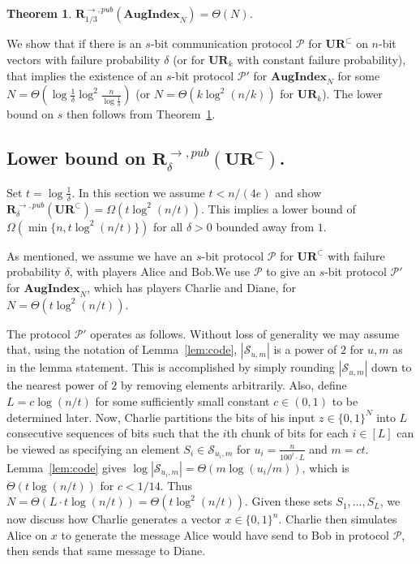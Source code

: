 \documentclass[11pt]{article}
\newtheorem{theorem}{Theorem}
\newcommand{\aug}{\mathbf{AugIndex}\xspace}
\newcommand{\ur}{\mathbf{UR}\xspace}
\newcommand{\randcom}{\mathbf{R}}
\begin{document}
\begin{theorem}{\cite{MiltersenNSW98}}\label{thm:mnsw}
$\randcom^{\rightarrow,pub}_{1/3}(\aug_N) = \Theta(N)$.
\end{theorem}

We show that if there is an $s$-bit communication protocol $\mathcal P$ for $\ur^\subset$ on $n$-bit vectors with failure probability $\delta$ (or for $\ur_k$ with constant failure probability), that implies the existence of an $s$-bit protocol $\mathcal P'$ for $\aug_N$ for some $N=\Theta(\log\frac 1{\delta}\log^2\frac n{\log\frac 1{\delta}})$ (or $N=\Theta(k\log^2(n/k))$ for $\ur_k$). The lower bound on $s$ then follows from Theorem~\ref{thm:mnsw}.


\subsection{Lower bound on $\randcom^{\rightarrow,pub}_\delta(\ur^\subset)$.}\label{sec:aug-delta}

Set $t = \log \frac 1{\delta}$. In this section we assume $t < n/(4e)$ and show $\randcom^{\rightarrow,pub}_\delta(\ur^\subset) = \Omega(t\log^2(n/t))$. This implies a lower bound of $\Omega(\min\{n, t\log^2(n/t)\})$ for all $\delta>0$ bounded away from $1$.

As mentioned, we assume we have an $s$-bit protocol $\mathcal P$ for $\ur^\subset$ with failure probability $\delta$, with players Alice and Bob.We use $\mathcal P$ to give an $s$-bit protocol $\mathcal P'$ for $\aug_N$, which has players Charlie and Diane, for $N = \Theta(t\log^2(n/t))$.

The protocol $\mathcal P'$ operates as follows. Without loss of generality we may assume that, using the notation of Lemma~\ref{lem:code}, $|\mathcal S_{u,m}|$ is a power of $2$ for $u, m$ as in the lemma statement. This is accomplished by simply rounding $|\mathcal S_{u,m}|$ down to the nearest power of $2$ by removing elements arbitrarily. Also, define $L = c\log(n/t)$ for some sufficiently small constant $c\in(0,1)$ to be determined later. Now, Charlie partitions the bits of his input $z\in\{0,1\}^N$ into $L$ consecutive sequences of bits such that the $i$th chunk of bits for each $i\in[L]$ can be viewed as specifying an element $S_i\in \mathcal S_{u_i,m}$ for $u_i = \frac n{100^i\cdot L}$ and $m = ct$. Lemma~\ref{lem:code} gives $\log|\mathcal S_{u_i,m}| = \Theta(m\log(u_i/m))$, which is $\Theta(t\log(n/t))$ for $c < 1/14$. Thus $N = \Theta(L\cdot t\log(n/t)) = \Theta(t\log^2(n/t))$. Given these sets $S_1,\ldots,S_L$, we now discuss how Charlie generates a vector $x\in\{0,1\}^n$. Charlie then simulates Alice on $x$ to generate the message Alice would have send to Bob in protocol $\mathcal P$, then sends that same message to Diane.
\end{document}
